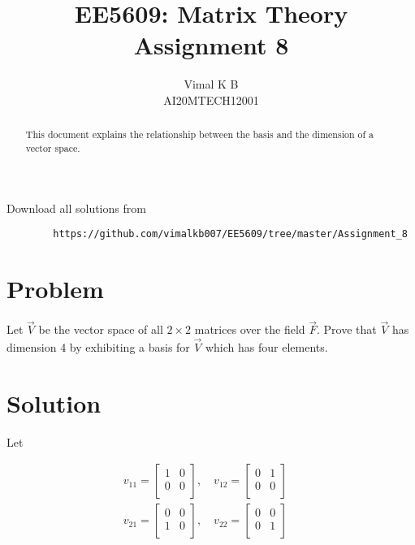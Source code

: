 \documentclass[journal,12pt,twocolumn]{IEEEtran}
\begin{document}
	\def\rightbox#1{\makebox[0in][r]{#1}}
	\def\centbox#1{\makebox[0in]{#1}}
	\def\topbox#1{\raisebox{-\baselineskip}[0in][0in]{#1}}
	\def\midbox#1{\raisebox{-0.5\baselineskip}[0in][0in]{#1}}
	\vspace{3cm}
	\title{EE5609: Matrix Theory\\
		Assignment 8\\}
	\author{Vimal K B\\
		AI20MTECH12001}
	\maketitle
	\newpage
	\bigskip
	\renewcommand{\thefigure}{\theenumi}
	\renewcommand{\thetable}{\theenumi}
	\begin{abstract}
		This document explains the relationship between the basis and the dimension of a vector space.
	\end{abstract}
	Download all solutions from 
	\begin{lstlisting}
		https://github.com/vimalkb007/EE5609/tree/master/Assignment_8
	\end{lstlisting}
	\section{Problem}
	Let $\vec{V}$ be the vector space of all $2\times 2$ matrices over the field $\vec{F}$. Prove that $\vec{V}$ has dimension 4 by exhibiting a basis for $\vec{V}$ which has four elements.
	
	\section{Solution}
	
	Let
	
	\begin{align}
		v_{11} = \begin{bmatrix}
			1 & 0 \\
			0 & 0 \\
		\end{bmatrix},
		\quad 
		v_{12} = \begin{bmatrix}
			0 & 1 \\
			0 & 0 \\
		\end{bmatrix}
		\quad \\
		v_{21} = \begin{bmatrix}
			0 & 0 \\
			1 & 0 \\
		\end{bmatrix},
		\quad 
		v_{22} = \begin{bmatrix}
			0 & 0 \\
			0 & 1 \\
		\end{bmatrix}
		\quad
	\end{align}
	
\end{document}
